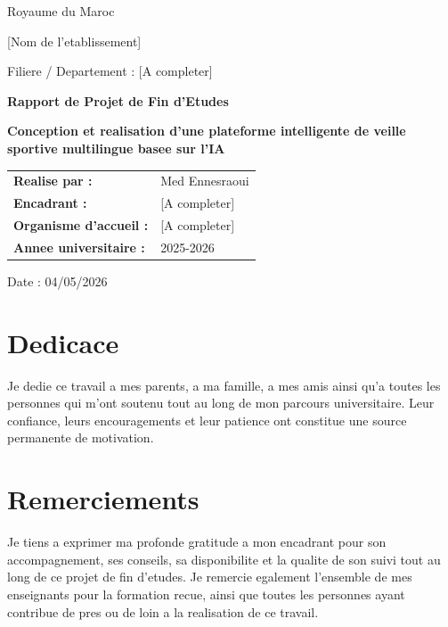 \documentclass[12pt,a4paper,oneside]{report}
\begin{document}
\begin{titlepage}
\centering

{\Large Royaume du Maroc\par}
{\Large [Nom de l'etablissement]\par}
\vspace{1cm}
{\large Filiere / Departement : [A completer]\par}
\vspace{2cm}

{\Huge \textbf{Rapport de Projet de Fin d'Etudes}\par}
\vspace{1cm}
{\LARGE \textbf{Conception et realisation d'une plateforme intelligente de veille sportive multilingue basee sur l'IA}\par}
\vspace{2cm}

\begin{tabular}{>{\bfseries}p{4cm}p{8cm}}
Realise par : & Med Ennesraoui \\
Encadrant : & [A completer] \\
Organisme d'accueil : & [A completer] \\
Annee universitaire : & 2025-2026 \\
\end{tabular}

\vfill

{\large Date : 04/05/2026\par}

\end{titlepage}

\cleardoublepage
\thispagestyle{empty}
\mbox{}
\cleardoublepage

\chapter*{Dedicace}
Je dedie ce travail a mes parents, a ma famille, a mes amis ainsi qu'a toutes les personnes qui m'ont soutenu tout au long de mon parcours universitaire. Leur confiance, leurs encouragements et leur patience ont constitue une source permanente de motivation.

\chapter*{Remerciements}
Je tiens a exprimer ma profonde gratitude a mon encadrant pour son accompagnement, ses conseils, sa disponibilite et la qualite de son suivi tout au long de ce projet de fin d'etudes. Je remercie egalement l'ensemble de mes enseignants pour la formation recue, ainsi que toutes les personnes ayant contribue de pres ou de loin a la realisation de ce travail.
\end{document}
